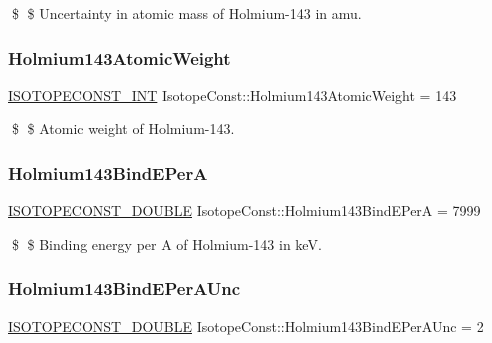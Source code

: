 \$ \$ Uncertainty in atomic mass of Holmium-\/143 in amu. \mbox{\label{group___isotope_const-_holmium-_ho143_gae93bf1c0b43995e5b96da735af739bde}} 
\subsubsection{\texorpdfstring{Holmium143\+Atomic\+Weight}{Holmium143AtomicWeight}}
{\footnotesize\ttfamily \mbox{\hyperlink{group___isotope_const-_macros_ga5f18360b3e99483a35c32d789e62621c}{I\+S\+O\+T\+O\+P\+E\+C\+O\+N\+S\+T\+\_\+\+I\+NT}} Isotope\+Const\+::\+Holmium143\+Atomic\+Weight = 143}

\$ \$ Atomic weight of Holmium-\/143. \mbox{\label{group___isotope_const-_holmium-_ho143_gaae856b2cda49465a68f98331d79a875e}} 
\subsubsection{\texorpdfstring{Holmium143\+Bind\+E\+PerA}{Holmium143BindEPerA}}
{\footnotesize\ttfamily \mbox{\hyperlink{group___isotope_const-_macros_ga8f45a7272ce02c0b4c65c44636ed719a}{I\+S\+O\+T\+O\+P\+E\+C\+O\+N\+S\+T\+\_\+\+D\+O\+U\+B\+LE}} Isotope\+Const\+::\+Holmium143\+Bind\+E\+PerA = 7999}

\$ \$ Binding energy per A of Holmium-\/143 in keV. \mbox{\label{group___isotope_const-_holmium-_ho143_ga555d09aa524c2c4e27bf3da460470ca3}} 
\subsubsection{\texorpdfstring{Holmium143\+Bind\+E\+Per\+A\+Unc}{Holmium143BindEPerAUnc}}
{\footnotesize\ttfamily \mbox{\hyperlink{group___isotope_const-_macros_ga8f45a7272ce02c0b4c65c44636ed719a}{I\+S\+O\+T\+O\+P\+E\+C\+O\+N\+S\+T\+\_\+\+D\+O\+U\+B\+LE}} Isotope\+Const\+::\+Holmium143\+Bind\+E\+Per\+A\+Unc = 2}

